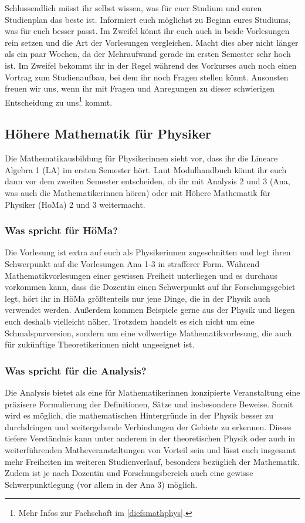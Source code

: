 Schlussendlich müsst ihr selbst wissen, was für euer Studium und euren Studienplan das beste ist. Informiert euch möglichst zu Beginn eures Studiums, was für euch besser passt. Im Zweifel könnt ihr euch auch in beide Vorlesungen rein setzen und die Art der Vorlesungen vergleichen. Macht dies aber nicht länger als ein paar Wochen, da der Mehraufwand gerade im ersten Semester sehr hoch ist. Im Zweifel bekommt ihr in der Regel während des Vorkurses auch noch einen Vortrag zum Studienaufbau, bei dem ihr noch Fragen stellen könnt. Ansonsten freuen wir uns, wenn ihr mit Fragen und Anregungen zu dieser schwierigen Entscheidung zu uns\footnote{Mehr Infos zur Fachschaft im \autoref{diefsmathphys}.} kommt.

\subsection{Höhere Mathematik für Physiker}
\label{mathephysik}
Die Mathematikausbildung für Physikerinnen sieht vor, dass ihr die Lineare Algebra 1 (\gls{LA}) im ersten Semester hört. Laut Modulhandbuch könnt ihr euch dann vor dem zweiten Semester entscheiden, ob ihr mit Analysis 2 und 3 (\gls{Ana}, was auch die Mathematikerinnen hören) oder mit Höhere Mathematik für Physiker (\gls{HoMa}) 2 und 3 weitermacht.
\subsubsection{Was spricht für HöMa?}
Die Vorlesung ist extra auf euch als Physikerinnen zugeschnitten und legt ihren Schwerpunkt auf die Vorlesungen Ana 1-3 in strafferer Form. Während Mathematikvorlesungen einer gewissen Freiheit unterliegen und es durchaus vorkommen kann, dass die Dozentin einen Schwerpunkt auf ihr Forschungsgebiet legt, hört ihr in HöMa größtenteils nur jene Dinge, die in der Physik auch verwendet werden. Außerdem kommen Beispiele gerne aus der Physik und liegen euch deshalb vielleicht näher. Trotzdem handelt es sich nicht um eine Schmalspurversion, sondern um eine vollwertige Mathematikvorlesung, die auch für zukünftige Theoretikerinnen nicht ungeeignet ist.
\subsubsection{Was spricht für die Analysis?}
Die Analysis bietet als eine für Mathematikerinnen konzipierte Veranstaltung eine präzisere Formulierung der Definitionen, Sätze und insbesondere Beweise. Somit wird es möglich, die mathematischen Hintergründe in der Physik besser zu durchdringen und weitergehende Verbindungen der Gebiete zu erkennen. Dieses tiefere Verständnis kann unter anderem in der theoretischen Physik oder auch in weiterführenden Matheveranstaltungen von Vorteil sein und lässt euch insgesamt mehr Freiheiten im weiteren Studienverlauf, besonders bezüglich der Mathematik. Zudem ist je nach Dozentin und Forschungsbereich auch eine gewisse Schwerpunktlegung (vor allem in der Ana 3) möglich.\\

